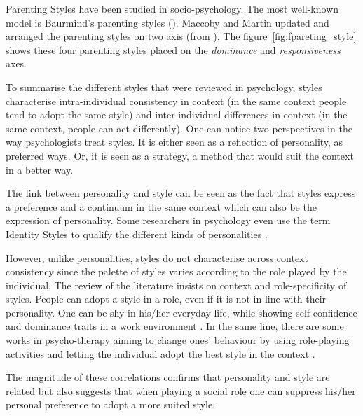 \documentclass[a4paper,twocolumn]{svjour3}
\begin{document}
Parenting Styles have been studied in socio-psychology. 
The most well-known model is Baurmind's parenting styles (\cite{baumrind1991influence}).
Maccoby and Martin updated and arranged  the parenting styles on two axis (from \cite{Darling1993}). 
The figure~\ref{fig:fpareting_style} shows these four parenting styles placed on the \textit{ dominance} and \textit{responsiveness} axes.





To summarise the different styles that were reviewed in psychology, styles characterise intra-individual consistency in context (in the same context people tend to adopt the same style) and inter-individual differences in context (in the same context, people can act differently). 
One can notice two perspectives in the way psychologists treat styles. 
It is either seen as a reflection of personality, as preferred ways. 
Or, it is seen as a strategy, a method that would suit the context in a better way. 

The link between personality and style \cite{Sternberg1997,Hayes} can be seen as the fact that styles express a preference and a continuum in the same context which can also be the expression of personality.
Some researchers in psychology even use the term Identity Styles to qualify the different kinds of personalities \cite{Berzonsky2011}.

However, unlike personalities, styles do not characterise across context consistency since the palette of styles varies according to the role played by the individual.
The review of the literature insists on context and role-specificity of styles. 
People can adopt a style in a role, even if it is not in line with their personality. 
One can be shy in his/her everyday life, while showing  self-confidence and dominance traits in a work environment .
In the same line, there are some works in psycho-therapy aiming to change ones' behaviour by using role-playing activities and letting the individual adopt the best style in the context \cite{Mehrabian1971}. 

The magnitude of these correlations confirms that personality and style are related but also suggests that when playing a social role one can suppress his/her personal preference to adopt a more suited style. 
\end{document}
